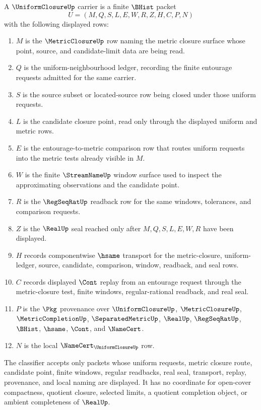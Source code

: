 \begin{definition}
\label{def:uniform-closure-carrier}
A $\UniformClosureUp$ carrier is a finite $\BHist$ packet
$$
U=(M,Q,S,L,E,W,R,Z,H,C,P,N)
$$
with the following displayed rows:
\begin{enumerate}
\item $M$ is the $\MetricClosureUp$ row naming the metric closure surface whose point, source, and candidate-limit data are being read.
\item $Q$ is the uniform-neighbourhood ledger, recording the finite entourage requests admitted for the same carrier.
\item $S$ is the source subset or located-source row being closed under those uniform requests.
\item $L$ is the candidate closure point, read only through the displayed uniform and metric rows.
\item $E$ is the entourage-to-metric comparison row that routes uniform requests into the metric tests already visible in $M$.
\item $W$ is the finite $\StreamNameUp$ window surface used to inspect the approximating observations and the candidate point.
\item $R$ is the $\RegSeqRatUp$ readback row for the same windows, tolerances, and comparison requests.
\item $Z$ is the $\RealUp$ seal reached only after $M,Q,S,L,E,W,R$ have been displayed.
\item $H$ records componentwise $\hsame$ transport for the metric-closure, uniform-ledger, source, candidate, comparison, window, readback, and seal rows.
\item $C$ records displayed $\Cont$ replay from an entourage request through the metric-closure test, finite windows, regular-rational readback, and real seal.
\item $P$ is the $\Pkg$ provenance over $\UniformClosureUp$, $\MetricClosureUp$, $\MetricCompletionUp$, $\SeparatedMetricUp$, $\RealUp$, $\RegSeqRatUp$, $\BHist$, $\hsame$, $\Cont$, and $\NameCert$.
\item $N$ is the local $\NameCert_{\UniformClosureUp}$ row.
\end{enumerate}
The classifier accepts only packets whose uniform requests, metric closure route, candidate point, finite windows, regular readbacks, real seal, transport, replay, provenance, and local naming are displayed. It has no coordinate for open-cover compactness, quotient closure, selected limits, a quotient completion object, or ambient completeness of $\RealUp$.
\end{definition}

